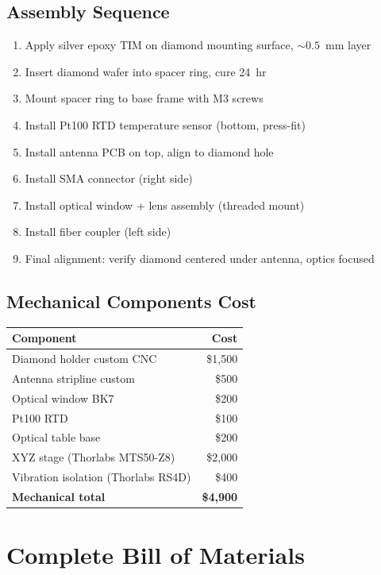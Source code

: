 \documentclass[11pt,a4paper,openany]{book}
\begin{document}
\section{Assembly Sequence}

\begin{enumerate}[nosep]
  \item Apply silver epoxy TIM on diamond mounting surface, ${\sim}0.5$~mm layer
  \item Insert diamond wafer into spacer ring, cure 24~hr
  \item Mount spacer ring to base frame with M3 screws
  \item Install Pt100 RTD temperature sensor (bottom, press-fit)
  \item Install antenna PCB on top, align to diamond hole
  \item Install SMA connector (right side)
  \item Install optical window + lens assembly (threaded mount)
  \item Install fiber coupler (left side)
  \item Final alignment: verify diamond centered under antenna, optics focused
\end{enumerate}

\section{Mechanical Components Cost}

\begin{center}
\begin{tabular}{lr}
\toprule
\textbf{Component} & \textbf{Cost} \\
\midrule
Diamond holder custom CNC & \$1,500 \\
Antenna stripline custom & \$500 \\
Optical window BK7 & \$200 \\
Pt100 RTD & \$100 \\
Optical table base & \$200 \\
XYZ stage (Thorlabs MTS50-Z8) & \$2,000 \\
Vibration isolation (Thorlabs RS4D) & \$400 \\
\midrule
\textbf{Mechanical total} & \textbf{\$4,900} \\
\bottomrule
\end{tabular}
\end{center}


\chapter{Complete Bill of Materials}\label{ch:bom}
\end{document}
